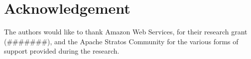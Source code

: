 \section{Acknowledgement}

The authors would like to thank Amazon Web Services, for their research grant (#######), and the Apache Stratos Community for the various forms of support provided during the research.





